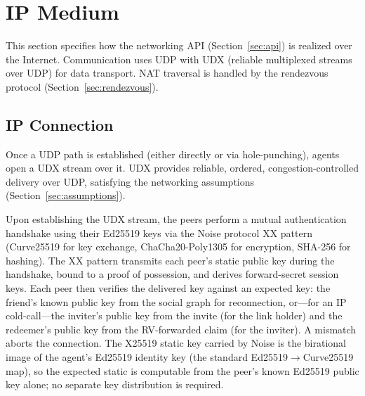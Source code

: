 \section{IP Medium}
\label{sec:ip}
This section specifies how the networking API (Section~\ref{sec:api}) is realized over the Internet.  Communication uses UDP with UDX (reliable multiplexed streams over UDP) for data transport.  NAT traversal is handled by the rendezvous protocol (Section~\ref{sec:rendezvous}).

\subsection{IP Connection}
\label{sec:ip-connection}
Once a UDP path is established (either directly or via hole-punching), agents open a UDX stream over it. UDX provides reliable, ordered, congestion-controlled delivery over UDP, satisfying the networking assumptions (Section~\ref{sec:assumptions}).

Upon establishing the UDX stream, the peers perform a mutual authentication handshake using their Ed25519 keys via the Noise protocol XX pattern (Curve25519 for key exchange, ChaCha20-Poly1305 for encryption, SHA-256 for hashing).  The XX pattern transmits each peer's static public key during the handshake, bound to a proof of possession, and derives forward-secret session keys.  Each peer then verifies the delivered key against an expected key: the friend's known public key from the social graph for reconnection, or---for an IP cold-call---the inviter's public key from the invite (for the link holder) and the redeemer's public key from the RV-forwarded claim (for the inviter).  A mismatch aborts the connection.  The X25519 static key carried by Noise is the birational image of the agent's Ed25519 identity key (the standard Ed25519$\to$Curve25519 map), so the expected static is computable from the peer's known Ed25519 public key alone; no separate key distribution is required.  

